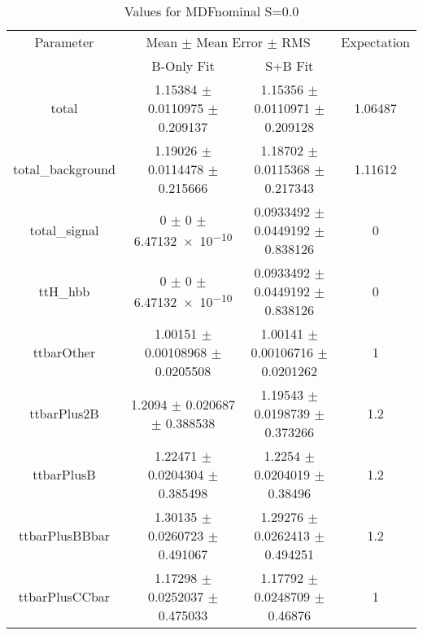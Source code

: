 \begin{table}
\centering
\caption{Values for MDFnominal S=0.0}
\begin{tabular}{cccc}
\toprule
Parameter & \multicolumn{2}{c}{Mean $\pm$ Mean Error $\pm$ RMS} & Expectation\\
 & B-Only Fit & S+B Fit & \\
\midrule
total & \num{1.15384} $\pm$ \num{0.0110975} $\pm$ \num{0.209137} & \num{1.15356} $\pm$ \num{0.0110971} $\pm$ \num{0.209128} & \num{1.06487}\\
total\_background & \num{1.19026} $\pm$ \num{0.0114478} $\pm$ \num{0.215666} & \num{1.18702} $\pm$ \num{0.0115368} $\pm$ \num{0.217343} & \num{1.11612}\\
total\_signal & \num{0} $\pm$ \num{0} $\pm$ \num{6.47132e-10} & \num{0.0933492} $\pm$ \num{0.0449192} $\pm$ \num{0.838126} & \num{0}\\
ttH\_hbb & \num{0} $\pm$ \num{0} $\pm$ \num{6.47132e-10} & \num{0.0933492} $\pm$ \num{0.0449192} $\pm$ \num{0.838126} & \num{0}\\
ttbarOther & \num{1.00151} $\pm$ \num{0.00108968} $\pm$ \num{0.0205508} & \num{1.00141} $\pm$ \num{0.00106716} $\pm$ \num{0.0201262} & \num{1}\\
ttbarPlus2B & \num{1.2094} $\pm$ \num{0.020687} $\pm$ \num{0.388538} & \num{1.19543} $\pm$ \num{0.0198739} $\pm$ \num{0.373266} & \num{1.2}\\
ttbarPlusB & \num{1.22471} $\pm$ \num{0.0204304} $\pm$ \num{0.385498} & \num{1.2254} $\pm$ \num{0.0204019} $\pm$ \num{0.38496} & \num{1.2}\\
ttbarPlusBBbar & \num{1.30135} $\pm$ \num{0.0260723} $\pm$ \num{0.491067} & \num{1.29276} $\pm$ \num{0.0262413} $\pm$ \num{0.494251} & \num{1.2}\\
ttbarPlusCCbar & \num{1.17298} $\pm$ \num{0.0252037} $\pm$ \num{0.475033} & \num{1.17792} $\pm$ \num{0.0248709} $\pm$ \num{0.46876} & \num{1}\\
\bottomrule
\end{tabular}
\end{table}